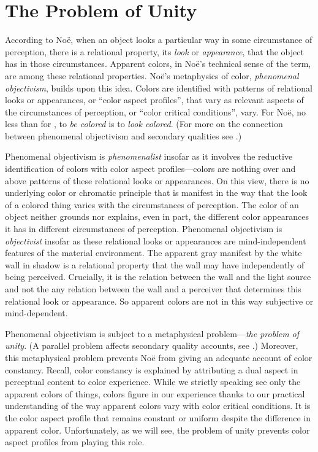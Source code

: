 \documentclass[12pt]{article}
\begin{document}
\section{The Problem of Unity} %
\label{sec:the_problem_of_unity}

According to Noë, when an object looks a particular way in some circumstance of perception, there is a relational property, its \emph{look} or \emph{appearance}, that the object has in those circumstances. Apparent colors, in Noë's technical sense of the term, are among these relational properties. Noë's metaphysics of color, \emph{phenomenal objectivism}, builds upon this idea. Colors are identified with patterns of relational looks or appearances, or ``color aspect profiles'', that vary as relevant aspects of the circumstances of perception, or ``color critical conditions'', vary. For Noë, no less than for \citet{Locke:1706hc}, to \emph{be colored} is to \emph{look colored}. (For more on the connection between phenomenal objectivism and secondary qualities see \citealt{Allen:2008kx}.)

Phenomenal objectivism is \emph{phenomenalist} insofar as it involves the reductive identification of colors with color aspect profiles---colors are nothing over and above patterns of these relational looks or appearances. On this view, there is no underlying color or chromatic principle that is manifest in the way that the look of a colored thing varies with the circumstances of perception. The color of an object neither grounds nor explains, even in part, the different color appearances it has in different circumstances of perception. Phenomenal objectivism is \emph{objectivist} insofar as these relational looks or appearances are mind-independent features of the material environment. The apparent gray manifest by the white wall in shadow is a relational property that the wall may have independently of being perceived. Crucially, it is the relation between the wall and the light source and not the any relation between the wall and a perceiver that determines this relational look or appearance. So apparent colors are not in this way subjective or mind-dependent.

Phenomenal objectivism is subject to a metaphysical problem---\emph{the problem of unity}. (A parallel problem affects secondary quality accounts, see \citealt{Allen:2008kx,Kalderon:2006fk}.) Moreover, this metaphysical problem prevents Noë from giving an adequate account of color constancy. Recall, color constancy is explained by attributing a dual aspect in perceptual content to color experience. While we strictly speaking see only the apparent colors of things, colors figure in our experience thanks to our practical understanding of the way apparent colors vary with color critical conditions. It is the color aspect profile that remains constant or uniform despite the difference in apparent color. Unfortunately, as we will see, the problem of unity prevents color aspect profiles from playing this role.
\end{document}

